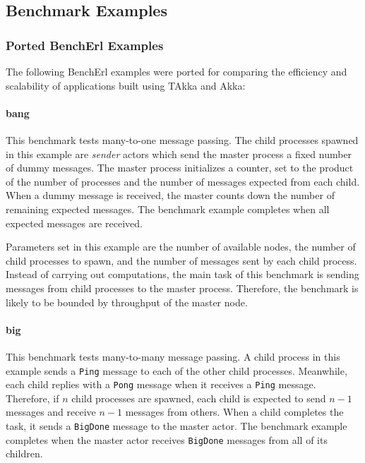 \newpage

\subsection{Benchmark Examples}

\subsubsection{Ported BenchErl Examples}
\label{ported_examples}

The following BenchErl examples were ported for comparing the efficiency 
and scalability of applications built using TAkka and Akka:

\paragraph{bang}  This benchmark tests many-to-one message passing.  The child 
processes spawned in this example are {\it sender} actors which send the 
master process a fixed number of dummy messages.  The master process 
initializes a counter, set to the product of the number of processes and the 
number of messages expected from each child.  When a dummy message is received, 
the master counts down the number of remaining expected messages.  The 
benchmark example completes when all expected messages are received.  

Parameters set in this example are the number of available nodes, the 
number of child processes to spawn, and the number of messages sent by each 
child process.  Instead of carrying out computations, the main task of this 
benchmark is sending messages from child processes to the master process.  
Therefore, the benchmark is likely to be bounded by throughput of the master node.


\paragraph{big}  This benchmark tests many-to-many message passing.  A child 
process in this example sends a {\tt Ping} message to each of the other child 
processes.  Meanwhile, each child replies with a {\tt Pong} message when it 
receives a {\tt Ping} message.  Therefore, if $n$ child processes are spawned, 
each child is expected to send $n-1$ messages and receive $n-1$ messages from 
others.  When a child completes the task, it sends a {\tt BigDone} message to 
the master actor.  The benchmark example completes when the master actor 
receives {\tt BigDone} messages from all of its children.  

